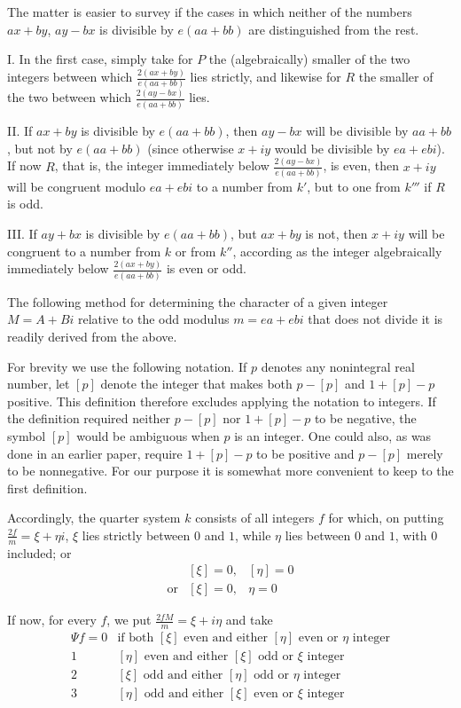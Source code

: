 The matter is easier to survey if the cases in which neither of the numbers $ax+by$, $ay-bx$ is divisible by $e(aa+bb)$ are distinguished from the rest.

I. In the first case, simply take for $P$ the (algebraically) smaller of the two integers between which $\frac{2(ax+by)}{e(aa+bb)}$ lies strictly, and likewise for $R$ the smaller of the two between which $\frac{2(ay-bx)}{e(aa+bb)}$ lies.

II. If $ax+by$ is divisible by $e(aa+bb)$, then $ay-bx$ will be divisible by $aa+bb$, but not by $e(aa+bb)$ (since otherwise $x+iy$ would be divisible by $ea+ebi$). If now $R$, that is, the integer immediately below $\frac{2(ay-bx)}{e(aa+bb)}$, is even, then $x+iy$ will be congruent modulo $ea+ebi$ to a number from $k'$, but to one from $k'''$ if $R$ is odd.

III. If $ay+bx$ is divisible by $e(aa+bb)$, but $ax+by$ is not, then $x+iy$ will be congruent to a number from $k$ or from $k''$, according as the integer algebraically immediately below $\frac{2(ax+by)}{e(aa+bb)}$ is even or odd.


The following method for determining the character of a given integer $M=A+Bi$ relative to the odd modulus $m=ea+ebi$ that does not divide it is readily derived from the above.

For brevity we use the following notation. If $p$ denotes any nonintegral real number, let $[p]$ denote the integer that makes both $p-[p]$ and $1+[p]-p$ positive. This definition therefore excludes applying the notation to integers. If the definition required neither $p-[p]$ nor $1+[p]-p$ to be negative, the symbol $[p]$ would be ambiguous when $p$ is an integer. One could also, as was done in an earlier paper, require $1+[p]-p$ to be positive and $p-[p]$ merely to be nonnegative. For our purpose it is somewhat more convenient to keep to the first definition.

Accordingly, the quarter system $k$ consists of all integers $f$ for which, on putting $\frac{2f}{m}=\xi+\eta i$, $\xi$ lies strictly between $0$ and $1$, while $\eta$ lies between $0$ and $1$, with $0$ included; or
\[
\begin{array}{lll}
&[\xi]=0,&[\eta]=0\\
\text{or}&[\xi]=0,&\eta=0
\end{array}
\]

If now, for every $f$, we put $\frac{2fM}{m}=\xi+i\eta$ and take
\begingroup\small\setlength{\arraycolsep}{2pt}
\[
\begin{array}{rl}
\Psi f=0&\text{if both }[\xi]\text{ even and either }[\eta]\text{ even or }\eta\text{ integer}\\
1&[\eta]\text{ even and either }[\xi]\text{ odd or }\xi\text{ integer}\\
2&[\xi]\text{ odd and either }[\eta]\text{ odd or }\eta\text{ integer}\\
3&[\eta]\text{ odd and either }[\xi]\text{ even or }\xi\text{ integer}
\end{array}
\]
\endgroup

